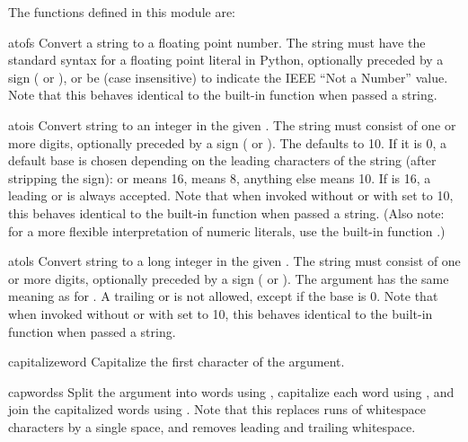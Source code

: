 The functions defined in this module are:


\begin{funcdesc}{atof}{s}
  Convert a string to a floating point number.  The string must have
  the standard syntax for a floating point literal in Python,
  optionally preceded by a sign (\samp{+} or \samp{-}), or be
   (case insensitive) to indicate the IEEE ``Not a
  Number'' value.  Note that this behaves identical to the built-in
  function  when passed a
  string.
\end{funcdesc}

\begin{funcdesc}{atoi}{s}
  Convert string  to an integer in the given .  The
  string must consist of one or more digits, optionally preceded by a
  sign (\samp{+} or \samp{-}).  The  defaults to 10.  If it
  is 0, a default base is chosen depending on the leading characters
  of the string (after stripping the sign):  or 
  means 16,  means 8, anything else means 10.  If 
  is 16, a leading  or  is always accepted.  Note
  that when invoked without  or with  set to 10,
  this behaves identical to the built-in function 
  when passed a string.  (Also note: for a more flexible
  interpretation of numeric literals, use the built-in function
  .)
\end{funcdesc}

\begin{funcdesc}{atol}{s}
  Convert string  to a long integer in the given .
  The string must consist of one or more digits, optionally preceded
  by a sign (\samp{+} or \samp{-}).  The  argument has the
  same meaning as for .  A trailing  or
   is not allowed, except if the base is 0.  Note that when
  invoked without  or with  set to 10, this
  behaves identical to the built-in function
   when passed a string.
\end{funcdesc}

\begin{funcdesc}{capitalize}{word}
  Capitalize the first character of the argument.
\end{funcdesc}

\begin{funcdesc}{capwords}{s}
  Split the argument into words using , capitalize
  each word using , and join the capitalized
  words using .  Note that this replaces runs of
  whitespace characters by a single space, and removes leading and
  trailing whitespace.
\end{funcdesc}

